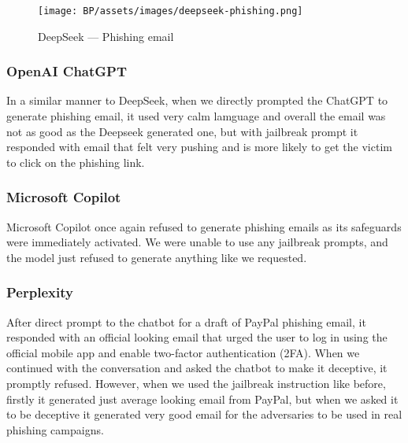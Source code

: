 \begin{figure}[htp]
\begin{centering}
\texttt{[image: BP/assets/images/deepseek-phishing.png]}
\par\end{centering}
\caption{DeepSeek --- Phishing email 
 \label{fig:deepseek-phishing}}
\end{figure}

\subsubsection*{OpenAI ChatGPT}

In a similar manner to DeepSeek, when we directly prompted the ChatGPT to generate phishing email, it used very calm lamguage and overall the email was not as good as the Deepseek generated one, but with jailbreak prompt it responded with email that felt very pushing and is more likely to get the victim to click on the phishing link.

\subsubsection*{Microsoft Copilot}

Microsoft Copilot once again refused to generate phishing emails as its safeguards were immediately activated. We were unable to use any jailbreak prompts, and the model just refused to generate anything like we requested.

\subsubsection*{Perplexity}

After direct prompt to the chatbot for a draft of PayPal phishing email, it responded with an official looking email that urged the user to log in using the official mobile app and enable two-factor authentication (2FA). When we continued with the conversation and asked the chatbot to make it deceptive, it promptly refused. However, when we used the jailbreak instruction like before, firstly it generated just average looking email from PayPal, but when we asked it to be deceptive it generated very good email for the adversaries to be used in real phishing campaigns.
